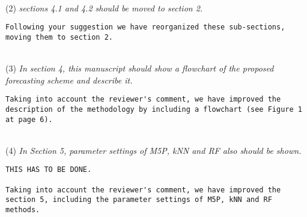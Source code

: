 \documentclass[preprint]{elsarticle}
\begin{document}
~\\
\noindent (2) \emph{sections 4.1 and 4.2 should be moved to section 2. } 

\begin{verbatim}
Following your suggestion we have reorganized these sub-sections, 
moving them to section 2.
\end{verbatim}

~\\
\noindent (3) \emph{In section 4, this manuscript should show a flowchart of the proposed forecasting scheme and describe it. } 

\begin{verbatim}
Taking into account the reviewer's comment, we have improved the 
description of the methodology by including a flowchart (see Figure 1 
at page 6).
\end{verbatim}

~\\
\noindent (4) \emph{In Section 5, parameter settings of M5P, kNN and RF also should be shown. } 

\begin{verbatim}
THIS HAS TO BE DONE.

Taking into account the reviewer's comment, we have improved the 
section 5, including the parameter settings of M5P, kNN and RF 
methods.
\end{verbatim}
\end{document}

